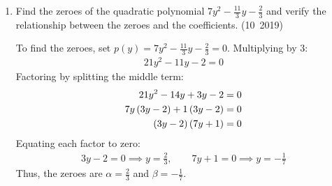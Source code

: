 \begin{enumerate}[label=\thesubsection.\arabic*, ref=\thesubsection.\theenumi]
	\solution
	From \eqref{eq:CBSE10-2019-poly_mod}, work in the quotient ring $\mathbb{R}[x] / \langle 3x^2 - 5 \rangle$, where the divisor induces the reduction relation:
	\begin{align}
		3x^2 - 5 \equiv 0 \implies x^2 \equiv \frac{5}{3}
	\end{align}
	Higher powers of the state variable $x$ reduce algebraically:
	\begin{align}
		x^3 &= x \cdot x^2 \equiv \frac{5}{3}x \\
		x^4 &= \brak{x^2}^2 \equiv \brak{\frac{5}{3}}^2 = \frac{25}{9}
	\end{align}
	Projecting $f(x)$ modulo $3x^2 - 5$:
	\begin{align}
		f(x) &\equiv 3\brak{\frac{25}{9}} - 9\brak{\frac{5}{3}x} + \brak{\frac{5}{3}} + 15x + k \\
		&\equiv \frac{25}{3} - 15x + \frac{5}{3} + 15x + k \\
		&\equiv \frac{30}{3} + k \equiv 10 + k \pmod{3x^2 - 5}
	\end{align}
	For $f(x)$ to be completely divisible, the remainder residue must be zero:
	\begin{align}
		10 + k = 0 \implies k = -10
	\end{align}
	The following code verifies the polynomial division:
	\begin{lstlisting}[frame=single, basicstyle=\ttfamily\small]
		codes/q29.py
	\end{lstlisting}
	
	\item Find the zeroes of the quadratic polynomial $7y^2-\frac{11}{3}y-\frac{2}{3}$ and verify the relationship between the zeroes and the coefficients.
	\hfill (10~2019)
	
	\solution
	To find the zeroes, set $p(y) = 7y^2 - \frac{11}{3}y - \frac{2}{3} = 0$.
	Multiplying by $3$:
	\begin{align}
		21y^2 - 11y - 2 = 0
	\end{align}
	Factoring by splitting the middle term:
	\begin{align}
		21y^2 - 14y + 3y - 2 &= 0 \\
		7y\left(3y - 2\right) + 1\left(3y - 2\right) &= 0 \\
		\left(3y - 2\right)\left(7y + 1\right) &= 0
	\end{align}
	Equating each factor to zero:
	\begin{align}
		3y - 2 = 0 \implies y = \frac{2}{3}, \qquad 7y + 1 = 0 \implies y = -\frac{1}{7}
	\end{align}
	Thus, the zeroes are $\alpha = \frac{2}{3}$ and $\beta = -\frac{1}{7}$.
	

\end{enumerate}
